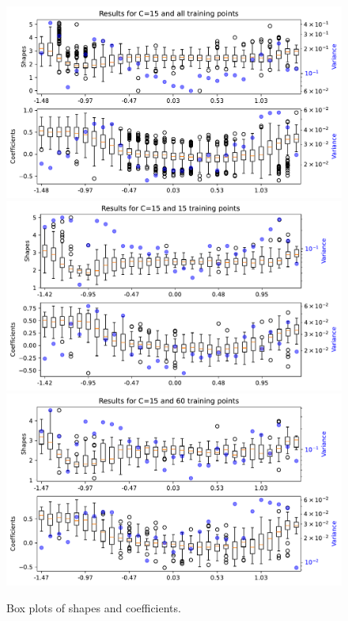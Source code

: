 \documentclass[12pt]{report} %
\begin{document}
\begin{figure}[h]
  \includegraphics[width=\textwidth]{imagenes/experiments/1d/statistical_1d_full_scheduler_interpolation/C15-All.pdf}
  \includegraphics[width=\textwidth]{imagenes/experiments/1d/statistical_1d_full_scheduler_interpolation/C15-TR15.pdf}
  \includegraphics[width=\textwidth]{imagenes/experiments/1d/statistical_1d_full_scheduler_interpolation/C15-TR60.pdf}
  \caption{Box plots of shapes and coefficients.}
  \label{fig:u2-results-shapes-etc}
\end{figure}
\end{document}
